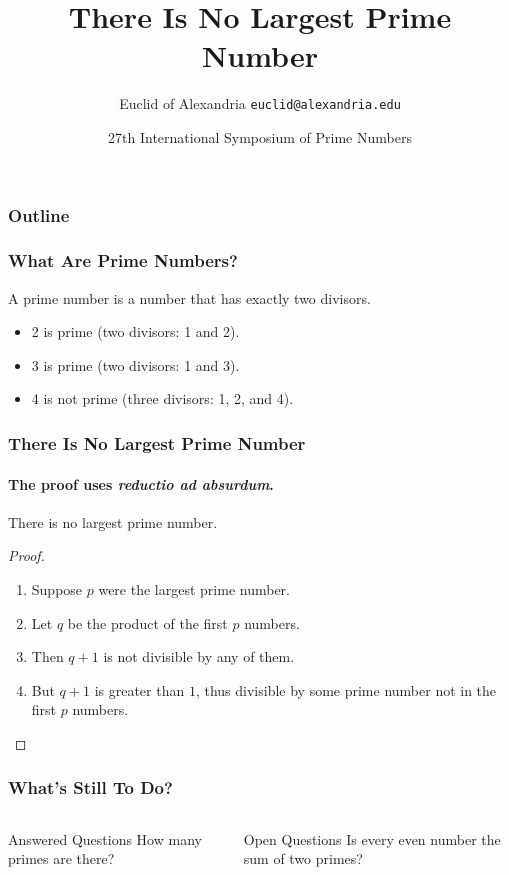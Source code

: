 \documentclass{beamer}
\title{There Is No Largest Prime Number}
\author[Euclid]{Euclid of Alexandria \texttt{euclid@alexandria.edu}}
\date[ISPN '80]{27th International Symposium of Prime Numbers}
\begin{document}
\begin{frame}
  \titlepage
\end{frame}

\begin{frame}
  \frametitle{Outline}
  \tableofcontents
\end{frame}

\begin{frame} 
  \frametitle{What Are Prime Numbers?}
  \begin{definition}
    A \alert{prime number} is a number that has exactly two divisors.
  \end{definition}
  \begin{example}
    \begin{itemize}
      \item 2 is prime (two divisors: 1 and 2).  \pause
      \item 3 is prime (two divisors: 1 and 3).  \pause
      \item 4 is not prime (\alert{three} divisors: 1, 2, and 4).
    \end{itemize}
  \end{example}

\end{frame}

\begin{frame}
  \frametitle{There Is No Largest Prime Number} \framesubtitle{The
    proof uses \textit{reductio ad absurdum}.}

  \begin{theorem}
    There is no largest prime number.
  \end{theorem}
  \begin{proof}
    \begin{enumerate}
      \item<1-> Suppose $p$ were the largest prime number.
      \item<2-> Let $q$ be the product of the first $p$ numbers.
      \item<3-> Then $q + 1$ is not divisible by any of them.
      \item<1-> But $q + 1$ is greater than $1$, thus divisible by
      some prime number not in the first $p$ numbers.\qedhere
    \end{enumerate}
  \end{proof}
\end{frame}

\begin{frame}
  \frametitle{What's Still To Do?}
  \begin{columns}[t]
    \begin{block}{Answered Questions}
      How many primes are there?
    \end{block}

    \pause

    \begin{block}{Open Questions}
      Is every even number the sum of two primes?
      \cite{Goldbach1742}
    \end{block}
  \end{columns}
\end{frame}
\end{document}
